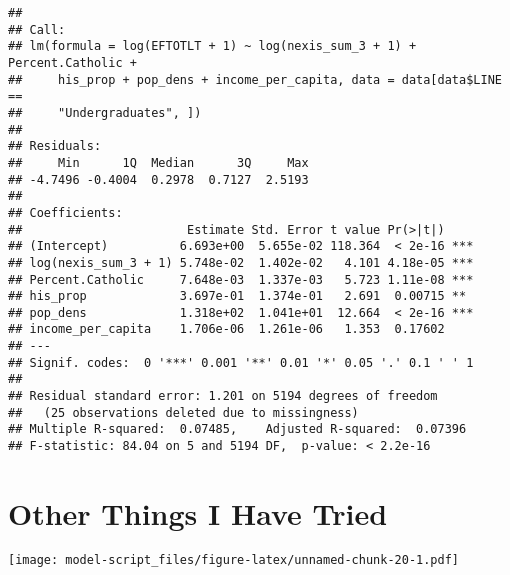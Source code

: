 \documentclass[]{article}
\newenvironment{Shaded}{\begin{snugshade}}{\end{snugshade}}
\newcommand{\KeywordTok}[1]{\textcolor[rgb]{0.13,0.29,0.53}{\textbf{#1}}}
\newcommand{\DataTypeTok}[1]{\textcolor[rgb]{0.13,0.29,0.53}{#1}}
\newcommand{\DecValTok}[1]{\textcolor[rgb]{0.00,0.00,0.81}{#1}}
\newcommand{\StringTok}[1]{\textcolor[rgb]{0.31,0.60,0.02}{#1}}
\newcommand{\OperatorTok}[1]{\textcolor[rgb]{0.81,0.36,0.00}{\textbf{#1}}}
\newcommand{\NormalTok}[1]{#1}
\begin{document}
\begin{verbatim}
## 
## Call:
## lm(formula = log(EFTOTLT + 1) ~ log(nexis_sum_3 + 1) + Percent.Catholic + 
##     his_prop + pop_dens + income_per_capita, data = data[data$LINE == 
##     "Undergraduates", ])
## 
## Residuals:
##     Min      1Q  Median      3Q     Max 
## -4.7496 -0.4004  0.2978  0.7127  2.5193 
## 
## Coefficients:
##                       Estimate Std. Error t value Pr(>|t|)    
## (Intercept)          6.693e+00  5.655e-02 118.364  < 2e-16 ***
## log(nexis_sum_3 + 1) 5.748e-02  1.402e-02   4.101 4.18e-05 ***
## Percent.Catholic     7.648e-03  1.337e-03   5.723 1.11e-08 ***
## his_prop             3.697e-01  1.374e-01   2.691  0.00715 ** 
## pop_dens             1.318e+02  1.041e+01  12.664  < 2e-16 ***
## income_per_capita    1.706e-06  1.261e-06   1.353  0.17602    
## ---
## Signif. codes:  0 '***' 0.001 '**' 0.01 '*' 0.05 '.' 0.1 ' ' 1
## 
## Residual standard error: 1.201 on 5194 degrees of freedom
##   (25 observations deleted due to missingness)
## Multiple R-squared:  0.07485,    Adjusted R-squared:  0.07396 
## F-statistic: 84.04 on 5 and 5194 DF,  p-value: < 2.2e-16
\end{verbatim}

\section{Other Things I Have Tried}\label{other-things-i-have-tried}

\begin{Shaded}
\end{Shaded}

\texttt{[image: model-script\_files/figure-latex/unnamed-chunk-20-1.pdf]}
\end{document}
